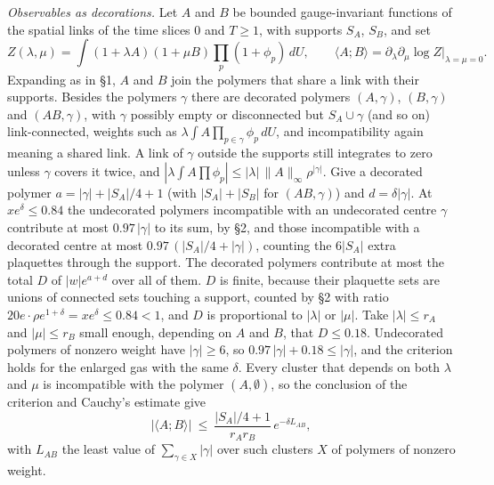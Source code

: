 \documentclass[11pt,a4paper]{article}
\begin{document}
\emph{Observables as decorations.} Let \(A\) and \(B\) be bounded
gauge-invariant functions of the spatial links of the time slices \(0\)
and \(T\ge1\), with supports \(S_A\), \(S_B\), and set
\[Z(\lambda,\mu)=\int(1+\lambda A)(1+\mu B)\prod_p(1+\phi_p)\,dU,\qquad
\langle A;B\rangle=\partial_\lambda\partial_\mu\log Z\big|_{\lambda=\mu=0}.\]
Expanding as in §1, \(A\) and \(B\) join the polymers that share a link
with their supports. Besides the polymers \(\gamma\) there are decorated
polymers \((A,\gamma)\), \((B,\gamma)\) and \((AB,\gamma)\), with
\(\gamma\) possibly empty or disconnected but \(S_A\cup\gamma\) (and so
on) link-connected, weights such as
\(\lambda\int A\prod_{p\in\gamma}\phi_p\,dU\), and incompatibility again
meaning a shared link. A link of \(\gamma\) outside the supports still
integrates to zero unless \(\gamma\) covers it twice, and
\(|\lambda\int A\prod \phi_p|\le|\lambda|\,\|A\|_\infty\rho^{|\gamma|}\).
Give a decorated polymer \(a=|\gamma|+|S_A|/4+1\) (with \(|S_A|+|S_B|\)
for \((AB,\gamma)\)) and \(d=\delta|\gamma|\). At \(xe^\delta\le0.84\)
the undecorated polymers incompatible with an undecorated centre
\(\gamma\) contribute at most \(0.97\,|\gamma|\) to its sum, by §2, and
those incompatible with a decorated centre at most
\(0.97\,(|S_A|/4+|\gamma|)\), counting the \(6|S_A|\) extra plaquettes
through the support. The decorated polymers contribute at most the total
\(D\) of \(|w|e^{a+d}\) over all of them. \(D\) is finite, because their
plaquette sets are unions of connected sets touching a support, counted
by §2 with ratio \(20e\cdot\rho e^{1+\delta}=xe^\delta\le0.84<1\), and
\(D\) is proportional to \(|\lambda|\) or \(|\mu|\). Take
\(|\lambda|\le r_A\) and \(|\mu|\le r_B\) small enough, depending on
\(A\) and \(B\), that \(D\le0.18\). Undecorated polymers of nonzero
weight have \(|\gamma|\ge6\), so \(0.97\,|\gamma|+0.18\le|\gamma|\), and
the criterion holds for the enlarged gas with the same \(\delta\). Every
cluster that depends on both \(\lambda\) and \(\mu\) is incompatible
with the polymer \((A,\emptyset)\), so the conclusion of the criterion
and Cauchy's estimate give
\[|\langle A;B\rangle|\ \le\ \frac{|S_A|/4+1}{r_Ar_B}\,e^{-\delta L_{AB}},\]
with \(L_{AB}\) the least value of \(\sum_{\gamma\in X}|\gamma|\) over
such clusters \(X\) of polymers of nonzero weight.
\end{document}
